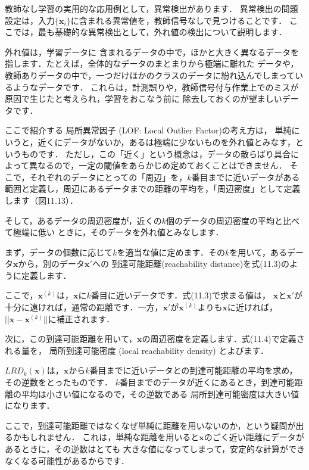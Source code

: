 教師なし学習の実用的な応用例として，異常検出があります．
異常検出の問題設定は，入力$\{\bm{x}_i\}$に含まれる異常値を，教師信号なしで見つけることです．
ここでは，最も基礎的な異常検出として，外れ値の検出について説明します．

外れ値は，学習データに
含まれるデータの中で，ほかと大きく異なるデータを指します．たとえば，全体的なデータのまとまりから極端に離れた
データや，教師ありデータの中で，一つだけほかのクラスのデータに紛れ込んでしまっているようなデータです．
これらは，計測誤りや，教師信号付与作業上でのミスが原因で生じたと考えられ，学習をおこなう前に
除去しておくのが望ましいデータです．


ここで紹介する
局所異常因子 (LOF: Local Outlier Factor)の考え方は，
単純にいうと，近くにデータがないか，あるは極端に少ないものを外れ値とみなす，というものです．
ただし，この「近く」という概念は，データの散らばり具合によって異なるので，一定の閾値をあらかじめ定めておくことはできません．
そこで，それぞれのデータにとっての「周辺」を，$k$番目までに近いデータがある範囲と定義し，周辺にあるデータまでの距離の平均を，「周辺密度」として定義します（図11.13）．

そして，あるデータの周辺密度が，近くの$k$個のデータの周辺密度の平均と比べて極端に低い
ときに，そのデータを外れ値とみなします．


まず，データの個数に応じて$k$を適当な値に定めます．その$k$を用いて，あるデータ$\bm{x}$から，別のデータ$\bm{x}'$への
到達可能距離(reachability distance)を式(11.3)のように定義します．

ここで，$\bm{x}^{(k)}$は，$\bm{x}$に$k$番目に近いデータです．式(11.3)で求まる値は，
$\bm{x}$と$\bm{x}'$が十分に遠ければ，通常の距離です．一方，$\bm{x}'$が$\bm{x}^{(k)}$よりも$\bm{x}$に近ければ，
$|| \bm{x}-\bm{x}^{(k)} ||$に補正されます．

次に，この到達可能距離を用いて，$\bm{x}$の周辺密度を定義します．式(11.4)で定義される量を，
局所到達可能密度 (local reachability density)
とよびます．

$LRD_k(\bm{x})$は，$\bm{x}$から$k$番目までに近いデータとの到達可能距離の平均を求め，その逆数をとったものです．
$k$番目までのデータが近くにあるとき，到達可能距離の平均は小さい値になるので，その逆数である
局所到達可能密度は大きい値になります．

ここで，到達可能距離ではなくなぜ単純に距離を用いないのか，という疑問が出るかもしれません．
これは，単純な距離を用いると$\bm{x}$のごく近い距離にデータがあるときに，その逆数はとても
大きな値になってしまって，安定的な計算ができなくなる可能性があるからです．

